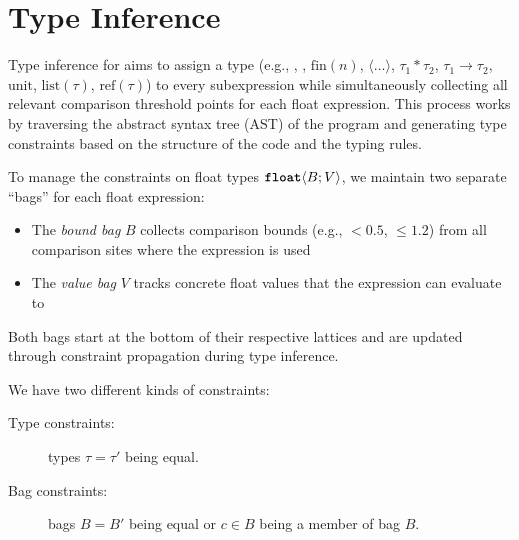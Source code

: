 \section{Type Inference}\label{sec:type-inference}

Type inference for \Slice{} aims to assign a type (e.g., \bool{}, \intty, $\text{fin}(n)$, \float$\langle \dots \rangle$, $\tau_1 * \tau_2$, $\tau_1 \rightarrow \tau_2$, $\text{unit}$, $\text{list}(\tau)$, $\text{ref}(\tau)$) to every subexpression while simultaneously collecting all relevant comparison threshold points for each float expression. This process works by traversing the abstract syntax tree (AST) of the program and generating type constraints based on the structure of the code and the typing rules.

To manage the constraints on float types $\text{\ttfamily\bfseries float}\langle B; V \rangle$, we maintain two separate ``bags'' for each float expression:
\begin{itemize}
    \item The \emph{bound bag} $B$ collects comparison bounds (e.g., $<0.5$, $\leq 1.2$) from all comparison sites where the expression is used
    \item The \emph{value bag} $V$ tracks concrete float values that the expression can evaluate to
\end{itemize}

Both bags start at the bottom of their respective lattices and are updated through constraint propagation during type inference. 

We have two different kinds of constraints:
\begin{description}
    \item[Type constraints:] types $\tau=\tau'$ being equal.
    \item[Bag constraints:] bags $B=B'$ being equal or $c \in B$ being a member of bag $B$.
\end{description}

